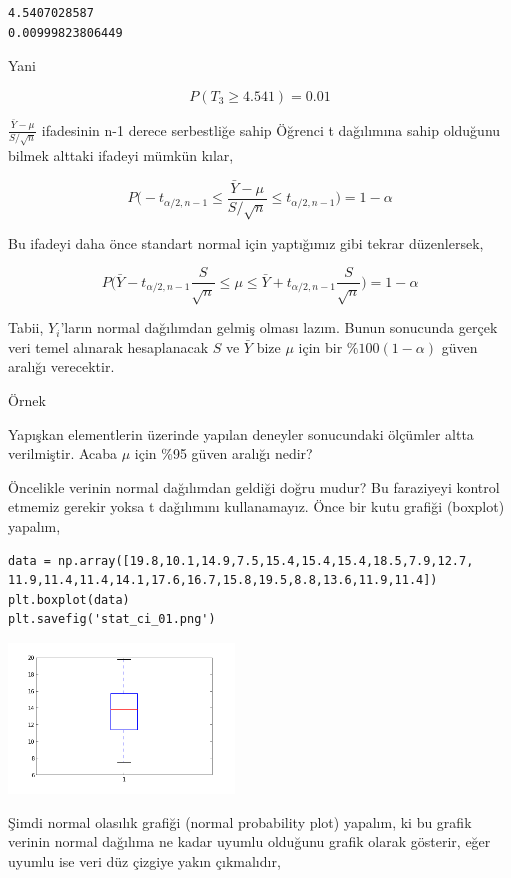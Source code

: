 \documentclass[12pt,fleqn]{article}\usepackage{../../common}
\begin{document}
\begin{verbatim}
4.5407028587
0.00999823806449
\end{verbatim}

Yani

$$ P(T_3 \ge 4.541) = 0.01 $$

$\frac{\bar{Y}-\mu}{S/\sqrt{n}}$ ifadesinin n-1 derece serbestliğe 
sahip Öğrenci t dağılımına sahip olduğunu bilmek alttaki ifadeyi mümkün kılar, 

$$ P \bigg(
-t_{\alpha/2,n-1} \le
\frac{\bar{Y}-\mu}{S/\sqrt{n}} \le 
t_{\alpha/2,n-1}
\bigg) = 1-\alpha
 $$

Bu ifadeyi daha önce standart normal için yaptığımız gibi tekrar
düzenlersek,

$$ P \bigg(
\bar{Y}-t_{\alpha/2,n-1}\frac{S}{\sqrt{n}} \le
\mu \le 
\bar{Y}+t_{\alpha/2,n-1}\frac{S}{\sqrt{n}}
\bigg) = 1-\alpha
$$

Tabii, $Y_i$'ların normal dağılımdan gelmiş olması lazım. Bunun sonucunda
gerçek veri temel alınarak hesaplanacak $S$ ve $\bar{Y}$ bize $\mu$ için
bir $\%100(1-\alpha)$ güven aralığı verecektir. 


Örnek

Yapışkan elementlerin üzerinde yapılan deneyler sonucundaki ölçümler altta
verilmiştir. Acaba $\mu$ için \%95 güven aralığı nedir?

Öncelikle verinin normal dağılımdan geldiği doğru mudur? Bu faraziyeyi
kontrol etmemiz gerekir yoksa t dağılımını kullanamayız. Önce bir kutu
grafiği (boxplot) yapalım,

\begin{verbatim}
data = np.array([19.8,10.1,14.9,7.5,15.4,15.4,15.4,18.5,7.9,12.7,
11.9,11.4,11.4,14.1,17.6,16.7,15.8,19.5,8.8,13.6,11.9,11.4])
plt.boxplot(data)
plt.savefig('stat_ci_01.png')
\end{verbatim}

\includegraphics[height=4cm]{stat_ci_01.png}

Şimdi normal olasılık grafiği (normal probability plot) yapalım, ki bu
grafik verinin normal dağılıma ne kadar uyumlu olduğunu grafik olarak
gösterir, eğer uyumlu ise veri düz çizgiye yakın çıkmalıdır,
\end{document}
